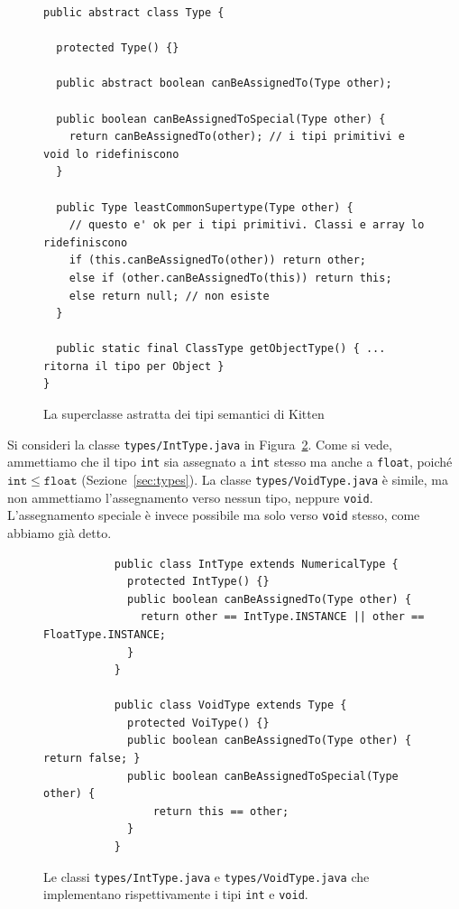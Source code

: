 \begin{figure}[t]
{\small
\begin{verbatim}
public abstract class Type {

  protected Type() {}

  public abstract boolean canBeAssignedTo(Type other);

  public boolean canBeAssignedToSpecial(Type other) {
    return canBeAssignedTo(other); // i tipi primitivi e void lo ridefiniscono
  }

  public Type leastCommonSupertype(Type other) {
    // questo e' ok per i tipi primitivi. Classi e array lo ridefiniscono
    if (this.canBeAssignedTo(other)) return other;
    else if (other.canBeAssignedTo(this)) return this;
    else return null; // non esiste
  }

  public static final ClassType getObjectType() { ... ritorna il tipo per Object }
}
\end{verbatim}
}
\caption{La superclasse astratta dei tipi semantici di Kitten}
  \label{fig:types.Type}
\end{figure}

Si consideri la classe \texttt{types/IntType.java}
in Figura~\ref{fig:types.IntVoidType}.
Come si vede, ammettiamo che il tipo \texttt{int} sia assegnato a
\texttt{int} stesso ma anche a \texttt{float}, poich\'e
$\mathtt{int}\le\mathtt{float}$ (Sezione~\ref{sec:types}).
La classe \texttt{types/VoidType.java} \`e simile, ma non ammettiamo
l'assegnamento verso nessun tipo, neppure \texttt{void}.
L'assegnamento speciale \`e invece possibile ma solo verso \texttt{void}
stesso, come abbiamo gi\`a detto.
%
\begin{figure}
{\small
\begin{verbatim}
           public class IntType extends NumericalType {
             protected IntType() {}
             public boolean canBeAssignedTo(Type other) {
               return other == IntType.INSTANCE || other == FloatType.INSTANCE;
             }
           }

           public class VoidType extends Type {
             protected VoiType() {}
             public boolean canBeAssignedTo(Type other) { return false; }
             public boolean canBeAssignedToSpecial(Type other) {
                 return this == other;
             }
           }
\end{verbatim}}
\caption{Le classi \texttt{types/IntType.java} e
         \texttt{types/VoidType.java} che implementano rispettivamente i tipi
         \texttt{int} e \texttt{void}.}
  \label{fig:types.IntVoidType}
\end{figure}

